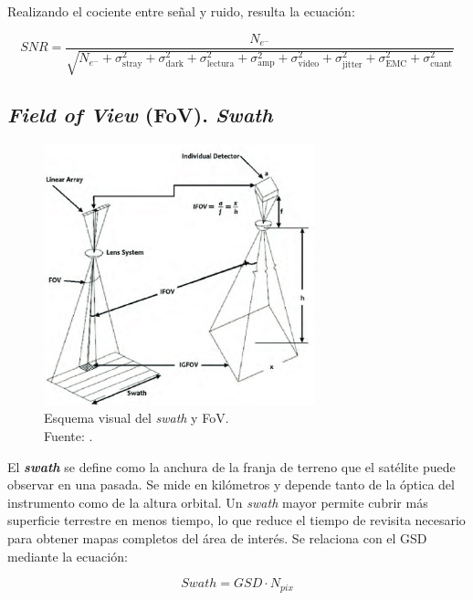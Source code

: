 Realizando el cociente entre señal y ruido, resulta la ecuación:

\begin{equation}
SNR = \frac{N_{e^-}}{\sqrt{N_{e^-} + \sigma_{\text{stray}}^2 + \sigma_{\text{dark}}^2 + \sigma_{\text{lectura}}^2 + \sigma_{\text{amp}}^2 + \sigma_{\text{vídeo}}^2 + \sigma_{\text{jitter}}^2 + \sigma_{\text{EMC}}^2 + \sigma_{\text{cuant}}^2}}
\end{equation}


\subsection{\textit{Field of View} (FoV). \textit{Swath}}

\begin{figure}[H]
    \centering
    \includegraphics[width=0.7\textwidth]{3.Conceptos_Previos/Swath,fov.png}
    \caption{Esquema visual del \textit{swath} y FoV.\\Fuente: \cite{swath_fov_diagram}.}
    \label{fig:swath}
\end{figure}

El \textit{\textbf{swath}} se define como la anchura de la franja de terreno que el satélite puede observar en una pasada. Se mide en kilómetros y depende tanto de la óptica del instrumento como de la altura orbital. Un \textit{swath} mayor permite cubrir más superficie terrestre en menos tiempo, lo que reduce el tiempo de revisita necesario para obtener mapas completos del área de interés. Se relaciona con el GSD mediante la ecuación:

\begin{equation}
\label{swath}
Swath = GSD \cdot N_{pix} 
\end{equation}

